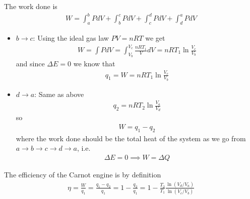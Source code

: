 \documentclass[../main.tex]{subfiles}
\begin{document}
The work done is
\begin{align*}
    W = \int_a^b PdV + \int_b^c PdV + \int_c^d PdV + \int_d^a PdV
\end{align*}
\begin{itemize}
    \item $b \to c$: Using the ideal gas law $PV = nRT$ we get
    \begin{align*}
        W = \int PdV = \int_{V_b}^{V_c} \frac{nRT_1}{V} dV = nRT_1 \ln \frac{V_c}{V_b}
    \end{align*}
    and since $\Delta E = 0$ we know that
    \begin{align*}
        q_1 = W = nRT_1 \ln \frac{V_c}{V_b}
    \end{align*}
    \item $d \to a$: Same as above
    \begin{align*}
        q_2 = nRT_2 \ln \frac{V_a}{V_d}
    \end{align*}
    so
    \begin{align*}
        W = q_1 - q_2
    \end{align*}
    where the work done should be the total heat of the system as we go from $a \to b \to c \to d \to a$, i.e.
    \begin{align*}
        \Delta E = 0 \implies W = \Delta Q
    \end{align*}
\end{itemize}
The efficiency of the Carnot engine is by definition
\begin{align*}
    \eta = \frac{W}{q_1} = \frac{q_1 - q_2}{q_1} = 1 - \frac{q_2}{q_1} = 1 - \frac{T_2}{T_1} \frac{\ln(V_d/V_a)}{\ln(V_c/V_b)}
\end{align*}

\newpage
{}
\end{document}
